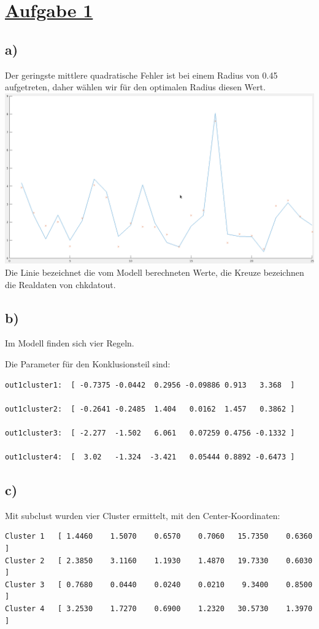 \section*{\underline{Aufgabe 1}}

\subsection*{a)}

Der geringste mittlere quadratische Fehler ist bei einem Radius von 0.45 aufgetreten, daher wählen wir für den optimalen Radius diesen Wert.\\

\includegraphics[width=\textwidth]{part/S9-A1a-Plot_1}\\

Die Linie bezeichnet die vom Modell berechneten Werte, die Kreuze bezeichnen die Realdaten von chkdatout.

\subsection*{b)}

Im Modell finden sich vier Regeln.

Die Parameter für den Konklusionsteil sind:

\begin{verbatim}
out1cluster1:  [ -0.7375 -0.0442  0.2956 -0.09886 0.913   3.368  ]

out1cluster2:  [ -0.2641 -0.2485  1.404   0.0162  1.457   0.3862 ]

out1cluster3:  [ -2.277  -1.502   6.061   0.07259 0.4756 -0.1332 ]

out1cluster4:  [  3.02   -1.324  -3.421   0.05444 0.8892 -0.6473 ]
\end{verbatim}

\clearpage

\subsection*{c)}

Mit subclust wurden vier Cluster ermittelt, mit den Center-Koordinaten:

\begin{verbatim}
Cluster 1   [ 1.4460    1.5070    0.6570    0.7060   15.7350    0.6360 ]
Cluster 2   [ 2.3850    3.1160    1.1930    1.4870   19.7330    0.6030 ]
Cluster 3   [ 0.7680    0.0440    0.0240    0.0210    9.3400    0.8500 ]
Cluster 4   [ 3.2530    1.7270    0.6900    1.2320   30.5730    1.3970 ]
\end{verbatim}